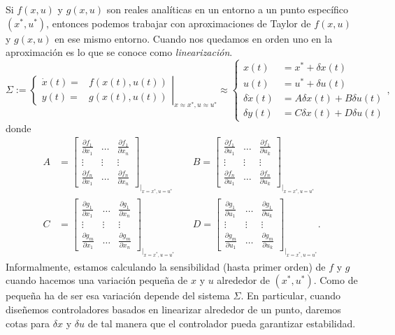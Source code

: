 Si $f(x,u)$ y $g(x,u)$ son reales analíticas en un entorno a un punto específico $(x^*,u^*)$, entonces podemos trabajar con aproximaciones de Taylor de $f(x,u)$ y $g(x,u)$ en ese mismo entorno. Cuando nos quedamos en orden uno en la aproximación es lo que se conoce como \emph{linearización}.
\begin{equation}
	\Sigma := \left.\begin{cases}
	\dot x(t) =& f(x(t),u(t)) \\ y(t) =& g(x(t),u(t))
	\end{cases}\right|_{x\approx x^*, u\approx u^*} \approx
	\begin{cases}
		x(t) &= x^* + \delta x(t) \\
		u(t) &= u^* + \delta u(t) \\
	\delta \dot x(t) &= A\delta x(t) + B\delta u(t) \\
	\delta y(t) &= C\delta x(t) + D\delta u(t)
	\end{cases}, \nonumber
\end{equation}
donde
\begin{align}
	A &= \begin{bmatrix}
		\frac{\partial f_1}{\partial x_1} & \dots & \frac{\partial f_1}{\partial x_n} \\
		\vdots & \vdots & \vdots \\
		\frac{\partial f_n}{\partial x_1} & \dots & \frac{\partial f_n}{\partial x_n}
	\end{bmatrix}_{|_{x=x^*, u=u^*}} \quad
	&B = \begin{bmatrix}
		\frac{\partial f_1}{\partial u_1} & \dots & \frac{\partial f_1}{\partial u_k} \\
		\vdots & \vdots & \vdots \\
		\frac{\partial f_n}{\partial u_1} & \dots & \frac{\partial f_n}{\partial u_k}
	\end{bmatrix}_{|_{x=x^*, u=u^*}} \nonumber \\
	C &= \begin{bmatrix}
		\frac{\partial g_1}{\partial x_1} & \dots & \frac{\partial g_1}{\partial x_n} \\
		\vdots & \vdots & \vdots \\
		\frac{\partial g_m}{\partial x_1} & \dots & \frac{\partial g_m}{\partial x_n}
	\end{bmatrix}_{|_{x=x^*, u=u^*}} \quad
	&D = \begin{bmatrix}
		\frac{\partial g_1}{\partial u_1} & \dots & \frac{\partial g_1}{\partial u_k} \\
		\vdots & \vdots & \vdots \\
		\frac{\partial g_m}{\partial u_1} & \dots & \frac{\partial g_m}{\partial u_k}
	\end{bmatrix}_{|_{x=x^*, u=u^*}}. \nonumber
\end{align}
Informalmente, estamos calculando la sensibilidad (hasta primer orden) de $f$ y $g$ cuando hacemos una variación pequeña de $x$ y $u$ alrededor de $(x^*,u^*)$. Como de pequeña ha de ser esa variación depende del sistema $\Sigma$. En particular, cuando diseñemos controladores basados en linearizar alrededor de un punto, daremos cotas para $\delta x$ y $\delta u$ de tal manera que el controlador pueda garantizar estabilidad.

